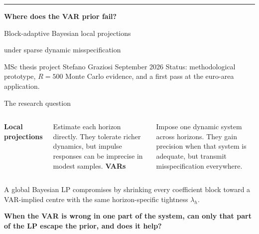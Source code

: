 \documentclass[aspectratio=169,11pt]{beamer}
\newcommand{\bigbox}[2]{%
  \colorbox{#1}{\parbox{0.955\textwidth}{\vspace{1.4mm}#2\vspace{1.4mm}}}}
\begin{document}
{
\begin{frame}[plain]
  \color{WarmWhite}
  \vspace{6mm}
  {\color{Teal}\rule{22mm}{2.4pt}}\par
  \vspace{5mm}
  {\fontsize{30}{34}\selectfont\bfseries
    Where does the VAR prior fail?\par}
  \vspace{3mm}
  {\fontsize{18}{22}\selectfont
    Block-adaptive Bayesian local projections\par
    under sparse dynamic misspecification}
  \vfill
  {\fontsize{12.5}{15.5}\selectfont\color{LightGray}
    MSc thesis project \quad Stefano Graziosi  September 2026}
  \vspace{2.5mm}
  {\fontsize{10}{12.5}\selectfont\color{LightGray}
    Status: methodological prototype, $R=500$ Monte Carlo evidence, and a first pass at the euro-area application.}
  \vspace{4mm}
\end{frame}
}

\begin{frame}{The research question}
  \begin{columns}[T,onlytextwidth]
      {\fontsize{13}{15.5}\selectfont\color{Teal}\bfseries Local projections}\par
      \vspace{1.5mm}
      Estimate each horizon directly. They tolerate richer dynamics, but
      impulse responses can be imprecise in modest samples.
      \centering\vspace{6mm}{\color{LightGray}\rule{0.7pt}{20mm}}
      {\fontsize{13}{15.5}\selectfont\color{Orange}\bfseries VARs}\par
      \vspace{1.5mm}
      Impose one dynamic system across horizons. They gain precision when
      that system is adequate, but transmit misspecification everywhere.
  \end{columns}
  \vspace{4mm}
  {\color{MidGray}
    A global Bayesian LP compromises by shrinking every coefficient block
    toward a VAR-implied centre with the same horizon-specific tightness
    $\lambda_h$.}
  \vspace{4mm}
  \bigbox{PaleTeal}{\fontsize{13.5}{16.5}\selectfont\bfseries
    When the VAR is wrong in one part of the system, can only that part
    of the LP escape the prior, and does it help?}
\end{frame}
\end{document}
